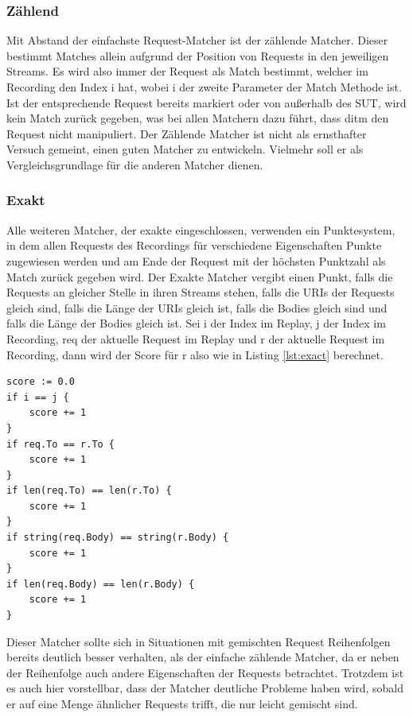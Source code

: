\documentclass[12pt,a4paper]{report}
\begin{document}
\subsubsection{Zählend}
Mit Abstand der einfachste Request-Matcher ist der zählende Matcher. Dieser bestimmt Matches allein aufgrund der Position
von Requests in den jeweiligen Streams. Es wird also immer der Request als Match bestimmt, welcher im Recording den Index i hat,
wobei i der zweite Parameter der Match Methode ist. Ist der entsprechende Request bereits markiert oder von außerhalb des SUT,
wird kein Match zurück gegeben, was bei allen Matchern dazu führt, dass ditm den Request nicht manipuliert.
Der Zählende Matcher ist nicht als ernsthafter Versuch gemeint, einen guten Matcher zu entwickeln. Vielmehr soll
er als Vergleichsgrundlage für die anderen Matcher dienen.

\subsubsection{Exakt}
Alle weiteren Matcher, der exakte eingeschlossen, verwenden ein Punktesystem, in dem allen Requests des Recordings für verschiedene
Eigenschaften Punkte zugewiesen werden und am Ende der Request mit der höchsten Punktzahl als Match zurück gegeben wird.
Der Exakte Matcher vergibt einen Punkt, falls die Requests an gleicher Stelle in ihren Streams stehen, falls die URIs der
Requests gleich sind, falls die Länge der URIs gleich ist, falls die Bodies gleich sind und falls die Länge der Bodies gleich ist.
Sei i der Index im Replay, j der Index im Recording, req der aktuelle Request im Replay und r der aktuelle
Request im Recording, dann wird der Score für r also wie in Listing \ref{lst:exact} berechnet.
\begin{lstlisting}[caption={Scoring Code für den Exakten Matcher}, label={lst:exact}]
score := 0.0
if i == j {
    score += 1
}
if req.To == r.To {
    score += 1
}
if len(req.To) == len(r.To) {
    score += 1
}
if string(req.Body) == string(r.Body) {
    score += 1
}
if len(req.Body) == len(r.Body) {
    score += 1
}
\end{lstlisting}
Dieser Matcher sollte sich in Situationen mit gemischten Request Reihenfolgen bereits deutlich besser verhalten, als der
einfache zählende Matcher, da er neben der Reihenfolge auch andere Eigenschaften der Requests betrachtet. Trotzdem ist es auch
hier vorstellbar, dass der Matcher deutliche Probleme haben wird, sobald er auf eine Menge ähnlicher Requests trifft, die nur
leicht gemischt sind.
\end{document}

